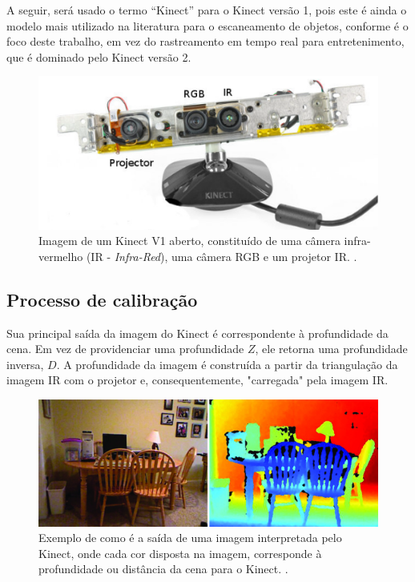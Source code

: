 A seguir, será usado o termo ``Kinect'' para o Kinect versão 1, pois este é ainda
o modelo mais utilizado na literatura para o escaneamento de objetos, conforme
é o foco deste trabalho, em vez do rastreamento em tempo real para entretenimento, que é
dominado pelo Kinect versão 2.

\begin{figure}[!h]
	\centering
	\includegraphics[width=0.5\linewidth]{figs/kinect.png}
	\caption{%
  Imagem de um Kinect V1 aberto, constituído de uma câmera infra-vermelho (IR -
  \emph{Infra-Red}), uma câmera RGB e um projetor IR.
  \protect\cite{smisek20133d}.
	}\label{fig:kinectv1}
\end{figure}

\subsection*{Processo de calibração}

Sua principal saída da imagem do Kinect é correspondente à profundidade da
cena. Em vez de providenciar uma profundidade $Z$, ele retorna uma profundidade
inversa, $D$.  A profundidade da imagem é construída a partir da triangulação
da imagem IR com o projetor e, consequentemente, "carregada" pela imagem IR.

\begin{figure}[!h]
	\centering
	\includegraphics[width=1\linewidth]{figs/profundidadekinect.png}
	\caption{%
	Exemplo de como é a saída de uma imagem interpretada pelo Kinect, onde cada cor disposta na imagem, corresponde à profundidade ou distância da cena para o Kinect.
	\cite{Silberman:ECCV12}.
	}\label{fig:profKinect}
\end{figure}
 
